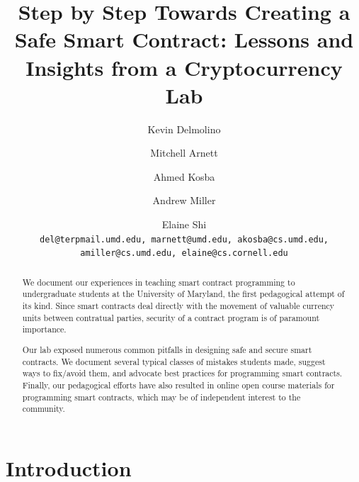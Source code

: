 \documentclass{llncs}
\begin{document}
\title{Step by Step Towards Creating a Safe Smart Contract: Lessons and Insights from a Cryptocurrency Lab}

\author{
  Kevin Delmolino
  \and
  Mitchell Arnett
  \and
  Ahmed Kosba
 \and
  Andrew Miller
  \and
  Elaine Shi \\
 \texttt{del@terpmail.umd.edu, marnett@umd.edu, akosba@cs.umd.edu, amiller@cs.umd.edu, elaine@cs.cornell.edu}
}

\maketitle


\begin{abstract}
We document our experiences in teaching smart contract 
programming to undergraduate students at the University of Maryland,
the first pedagogical attempt of its kind.
Since smart contracts deal directly with the movement of valuable currency units
between contratual parties, 
security of a contract program is of paramount importance.  

Our lab exposed numerous common pitfalls 
in designing safe and secure smart contracts. 
We document several typical classes of mistakes students made, %
suggest ways to fix/avoid them, 
and advocate best practices for programming smart contracts.
Finally, our pedagogical efforts have also resulted in online open
course materials for 
programming smart contracts, which may be of independent interest to the community.
\end{abstract}

\section{Introduction}
\end{document}
